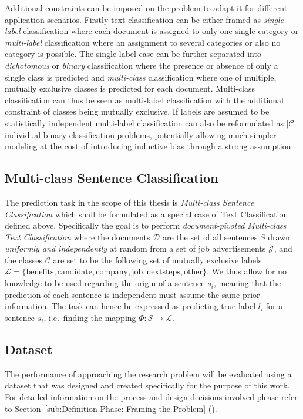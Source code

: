 Additional constraints can be imposed on the problem to adapt it for different application scenarios. Firstly text classification can be either framed as \emph{single-label} classification where each document is assigned to only one single category or \emph{multi-label} classification where an assignment to several categories or also no category is possible. The single-label case can be further separated into \emph{dichotomous} or \emph{binary} classification where the presence or absence of only a single class is predicted and \emph{multi-class} classification where one of multiple, mutually exclusive classes is predicted for each document.
Multi-class classification can thus be seen as multi-label classification with the additional constraint of classes being mutually exclusive.
If labels are assumed to be statistically independent multi-label classification can also be reformulated as $|\mathcal{C}|$ individual binary classification problems, potentially allowing much simpler modeling at the cost of introducing inductive bias through a strong assumption.


\subsection{Multi-class Sentence Classification}
\label{subs:Multi-class Sentence Classification}

The prediction task in the scope of this thesis is \emph{Multi-class Sentence Classification} which shall be formulated as a special case of Text Classification defined above. Specifically the goal is to perform \emph{document-pivoted Multi-class Text Classification} where the documents $\mathcal{D}$ are the set of all sentences $S$ drawn \emph{uniformly and independently} at random from a set of job advertisements $\mathcal{J}$, and the classes $\mathcal{C}$ are set to be the following set of mutually exclusive labels $\mathcal{L} = \{ \text{benefits}, \text{candidate}, \text{company}, \text{job}, \text{nextsteps}, \text{other} \}$. We thus allow for no knowledge to be used regarding the origin of a sentence $s_i$, meaning that the prediction of each sentence is independent must assume the same prior information. The task can hence be expressed as predicting true label $l_i$ for a sentence $s_i$, i.e.\ finding the mapping $\widetilde{\Phi} : \mathcal{S} \rightarrow \mathcal{L}$.

\subsection{Dataset}
\label{subs:Dataset}

The performance of approaching the research problem will be evaluated using a dataset that was designed and created specifically for the purpose of this work. For detailed information on the process and design decisions involved please refer to Section~\ref{sub:Definition Phase: Framing the Problem} ().
